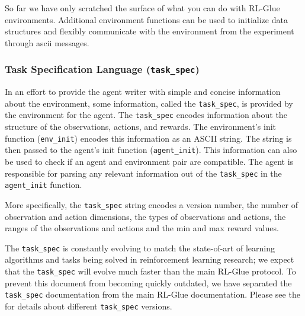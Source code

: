 \documentclass[11pt]{article}
\begin{document}
So far we have only scratched the surface of what you can do with RL-Glue environments. Additional environment functions can be used to initialize data structures and flexibly communicate with the environment from the experiment through ascii messages.

\subsubsection{Task Specification Language (\texttt{task\_spec})}
\label{task}
In an effort to provide the agent writer with simple and concise information about the environment, some information, called the \texttt{task\_spec}, is provided by the environment for the agent.  The \texttt{task\_spec} encodes information about the structure of the observations, actions, and rewards. The environment's init function (\texttt{env\_init}) encodes this information as an ASCII string. The string is then passed to the agent's init function (\texttt{agent\_init}).  This information can also be used to check if an agent and environment pair are compatible. The agent is responsible for parsing any relevant information out of the \texttt{task\_spec} in the \texttt{agent\_init}  function. 

More specifically, the \texttt{task\_spec} string encodes a version number, the number of observation and action dimensions, the types of observations and actions, the ranges of the observations and actions and the min and max reward values. 

The \texttt{task\_spec} is constantly evolving to match the state-of-art of learning algorithms and tasks being solved in reinforcement learning research; we expect that the \texttt{task\_spec} will evolve much faster than the main RL-Glue protocol.  To prevent this document from becoming quickly outdated, we have separated the \texttt{task\_spec} documentation from the main RL-Glue documentation. Please see the  for details about different \texttt{task\_spec} versions.
\end{document}
